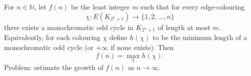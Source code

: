 For $n\in\mathbb N$, let $f(n)$ be the least integer $m$ such that for every edge-colouring
\[
\chi:E(K_{2^n+1})\to\{1,2,\dots,n\}
\]
there exists a monochromatic odd cycle in $K_{2^n+1}$ of length at most $m$.
Equivalently, for each colouring $\chi$ define $h(\chi)$ to be the minimum length of a monochromatic odd cycle (or $+\infty$ if none exists). Then
\[
f(n)=\max_{\chi} h(\chi).
\]
Problem: estimate the growth of $f(n)$ as $n\to\infty$.
